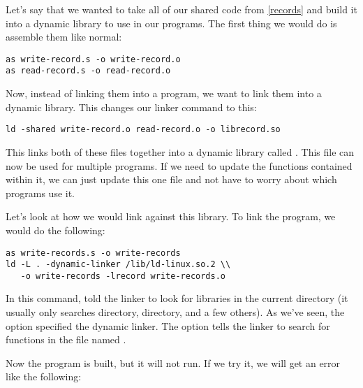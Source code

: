Let's say that we wanted to take all of our shared code from 
\autoref{records} and build it into a dynamic library to
use in our programs.  The first thing we would do is assemble them
like normal:

\begin{simpletyping}
\begin{lstlisting}
as write-record.s -o write-record.o
as read-record.s -o read-record.o
\end{lstlisting}
\end{simpletyping}

Now, instead of linking them into a program, we want to link
them into a dynamic library.  This changes our linker command
to this:

\begin{simpletyping}
\begin{lstlisting}
ld -shared write-record.o read-record.o -o librecord.so
\end{lstlisting}
\end{simpletyping}

This links both of these files together into a dynamic library
called .  This file can now
be used for multiple programs.  If we need to update the functions
contained within it, we can just update this one file and not
have to worry about which programs use it.

Let's look at how we would link against this library.  To link
the  program, we would do the
following:

\begin{simpletyping}
\begin{lstlisting}
as write-records.s -o write-records
ld -L . -dynamic-linker /lib/ld-linux.so.2 \\
   -o write-records -lrecord write-records.o
\end{lstlisting}
\end{simpletyping}

In this command,  told the linker to look
for libraries in the current directory (it usually only searches 
 directory, 
directory, and a few others).  As we've seen, the option
 specified the dynamic 
linker.  The option  tells the linker to search 
for functions in the file named .  

Now the  program is built, but it will not 
run.  If we try it, we will get an error like the following:

